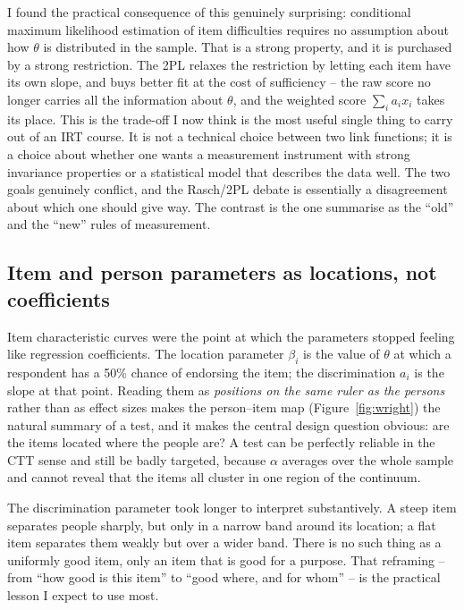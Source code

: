 \documentclass[11pt,a4paper]{article}
\begin{document}
I found the practical consequence of this genuinely surprising: conditional
maximum likelihood estimation of item difficulties requires no assumption about
how $\theta$ is distributed in the sample. That is a strong property, and it is
purchased by a strong restriction. The 2PL relaxes the restriction by letting each
item have its own slope, and buys better fit at the cost of sufficiency -- the raw
score no longer carries all the information about $\theta$, and the weighted score
$\sum_i a_i x_i$ takes its place. This is the trade-off I now think is the most
useful single thing to carry out of an IRT course. It is not a technical choice
between two link functions; it is a choice about whether one wants a measurement
instrument with strong invariance properties or a statistical model that describes
the data well. The two goals genuinely conflict, and the Rasch/2PL debate is
essentially a disagreement about which one should give way. The contrast is the
one \citet{embretson2000item} summarise as the ``old'' and the ``new'' rules of
measurement.

\subsection{Item and person parameters as locations, not coefficients}

Item characteristic curves were the point at which the parameters stopped feeling
like regression coefficients. The location parameter $\beta_i$ is the value of
$\theta$ at which a respondent has a 50\% chance of endorsing the item; the
discrimination $a_i$ is the slope at that point. Reading them as \emph{positions
on the same ruler as the persons} rather than as effect sizes makes the
person--item map (Figure~\ref{fig:wright}) the natural summary of a test, and it
makes the central design question obvious: are the items located where the people
are? A test can be perfectly reliable in the CTT sense and still be badly targeted,
because $\alpha$ averages over the whole sample and cannot reveal that the items
all cluster in one region of the continuum.

The discrimination parameter took longer to interpret substantively. A steep item
separates people sharply, but only in a narrow band around its location; a flat
item separates them weakly but over a wider band. There is no such thing as a
uniformly good item, only an item that is good for a purpose. That reframing --
from ``how good is this item'' to ``good where, and for whom'' -- is the practical
lesson I expect to use most.
\end{document}
